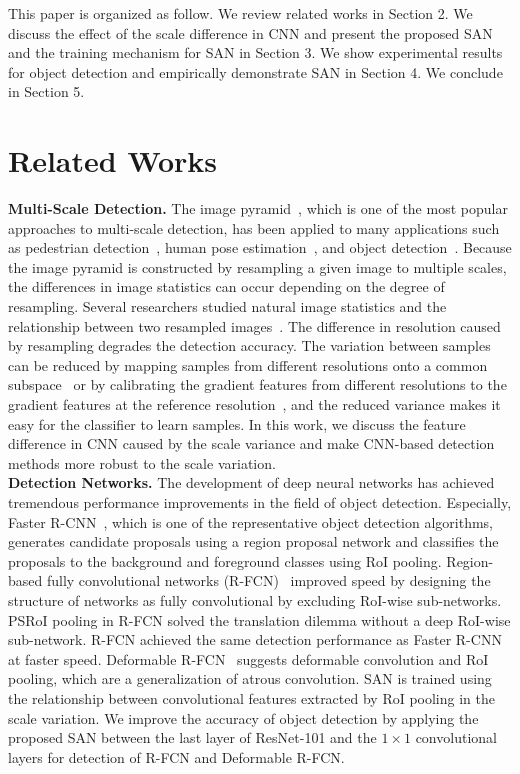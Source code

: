 \documentclass[runningheads]{llncs}
\begin{document}
This paper is organized as follow.
We review related works in Section 2.
We discuss the effect of the scale difference in CNN and present the proposed SAN and the training mechanism for SAN in Section 3.
We show experimental results for object detection and empirically demonstrate SAN in Section 4.
We conclude in Section 5.

\section{Related Works}

\noindent
\textbf{Multi-Scale Detection.}
The image pyramid~\cite{adelson1984pyramid,gonzalez2009digital}, which is one of the most popular approaches to multi-scale detection, has been applied to many applications such as pedestrian detection~\cite{dalal2005histograms,ding2012contextual,dollar2014fast,dollar2009integral}, human pose estimation~\cite{yang2013articulated}, and object detection~\cite{felzenszwalb2010object}.
Because the image pyramid is constructed by resampling a given image to multiple scales, the differences in image statistics can occur depending on the degree of resampling.
Several researchers studied natural image statistics and the relationship between two resampled images~\cite{field1987relations,ruderman1994statistics,ruderman1994statistics1}.
The difference in resolution caused by resampling degrades the detection accuracy.
The variation between samples can be reduced by mapping samples from different resolutions onto a common subspace~\cite{yan2013robust} or by calibrating the gradient features from different resolutions to the gradient features at the reference resolution~\cite{detector2017icip}, and the reduced variance makes  it easy for the classifier to learn samples.
In this work, we discuss the feature difference in CNN caused by the scale variance and make CNN-based detection methods more robust to the scale variation.
\\

\noindent
\textbf{Detection Networks.}
The development of deep neural networks has achieved tremendous performance improvements in the field of object detection.
Especially, Faster R-CNN~\cite{ren2015faster}, which is one of the representative object detection algorithms,
generates candidate proposals using a region proposal network and classifies the proposals to the background and foreground classes using RoI pooling.
Region-based fully convolutional networks (R-FCN)~\cite{li2016r} improved speed by designing the structure of networks as fully convolutional by excluding RoI-wise sub-networks.
PSRoI pooling in R-FCN solved the translation dilemma without a deep RoI-wise sub-network.
R-FCN achieved the same detection performance as Faster R-CNN at faster speed.
Deformable R-FCN~\cite{dai17dcn} suggests deformable convolution and RoI pooling, which are a generalization of atrous convolution.
SAN is trained using the relationship between convolutional features extracted by RoI pooling in the scale variation.
We improve the accuracy of object detection by applying the proposed SAN between the last layer of ResNet-101 and the $1\times1$ convolutional layers for detection of R-FCN and Deformable R-FCN.
\end{document}
